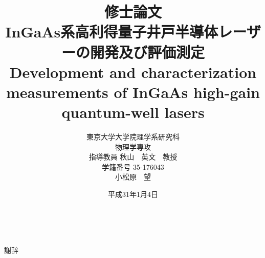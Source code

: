 \documentclass[11pt]{jreport}
\title{
{\LARGE 修士論文\\[1cm]}
{\huge InGaAs系高利得量子井戸半導体レーザーの開発及び評価測定\\[1cm]
Development and characterization measurements of InGaAs high-gain quantum-well
lasers\\[5cm]}
}
\date{\LARGE 平成31年1月4日}
\author{\LARGE 東京大学大学院理学系研究科\\
\LARGE 物理学専攻\\[1cm]
\LARGE 指導教員 秋山　英文　教授\\[1cm]
\LARGE 学籍番号 35-176043\\
\LARGE 小松原　望}
\begin{document}
\maketitle			%
\tableofcontents 	%
\listoffigures 		%
\listoftables　		%



謝辞

\end{document}
